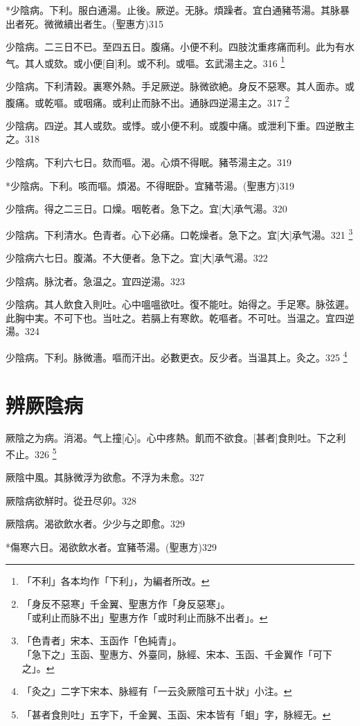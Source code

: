 \documentclass[12pt,twoside,UTF8,b5paper]{ctexbook}
\begin{document}
*少陰病。下利。服白通湯。止後。厥逆。无脉。煩躁者。宜白通豬苓湯。其脉暴出者死。微微續出者生。(聖惠方)315

少陰病。二三日不已。至四五日。腹痛。小便不利。四肢沈重疼痛而利。此为有水气。其人或欬。或小便[自]利。或不利。或嘔。玄武湯主之。316
	\footnote{「不利」各本均作「下利」，为編者所改。}

少陰病。下利清穀。裏寒外熱。手足厥逆。脉微欲絶。身反不惡寒。其人面赤。或腹痛。或乾嘔。或咽痛。或利止而脉不出。通脉四逆湯主之。317
	\footnote{「身反不惡寒」千金翼、聖惠方作「身反惡寒」。\\「或利止而脉不出」聖惠方作「或时利止而脉不出者」。}

少陰病。四逆。其人或欬。或悸。或小便不利。或腹中痛。或泄利下重。四逆散主之。318

少陰病。下利六七日。欬而嘔。渴。心煩不得眠。豬苓湯主之。319

*少陰病。下利。咳而嘔。煩渴。不得眠卧。宜豬苓湯。(聖惠方)319

少陰病。得之二三日。口燥。咽乾者。急下之。宜[大]承气湯。320

少陰病。下利清水。色青者。心下必痛。口乾燥者。急下之。宜[大]承气湯。321
	\footnote{「色青者」宋本、玉函作「色純青」。\\「急下之」玉函、聖惠方、外臺同，脉經、宋本、玉函、千金翼作「可下之」。}

少陰病六七日。腹滿。不大便者。急下之。宜[大]承气湯。322

少陰病。脉沈者。急温之。宜四逆湯。323

少陰病。其人飲食入則吐。心中嗢嗢欲吐。復不能吐。始得之。手足寒。脉弦遲。此胸中実。不可下也。当吐之。若膈上有寒飲。乾嘔者。不可吐。当温之。宜四逆湯。324

少陰病。下利。脉微濇。嘔而汗出。必數更衣。反少者。当温其上。灸之。325
	\footnote{「灸之」二字下宋本、脉經有「一云灸厥陰可五十狀」小注。}

\chapter{辨厥陰病}

厥陰之为病。消渴。气上撞[心]。心中疼熱。飢而不欲食。[甚者]食則吐。下之利不止。326
	\footnote{「甚者食則吐」五字下，千金翼、玉函、宋本皆有「蛔」字，脉經无。}

厥陰中風。其脉微浮为欲愈。不浮为未愈。327

厥陰病欲觧时。從丑尽卯。328

厥陰病。渴欲飲水者。少少与之即愈。329

*傷寒六日。渴欲飲水者。宜豬苓湯。(聖惠方)329
\end{document}
